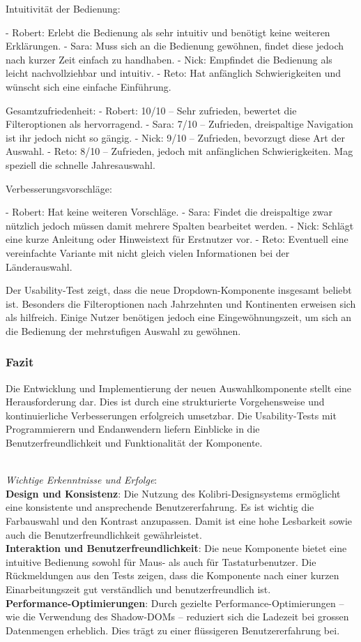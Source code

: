 Intuitivität der Bedienung:

- Robert: Erlebt die Bedienung als sehr intuitiv und benötigt keine weiteren Erklärungen.
- Sara: Muss sich an die Bedienung gewöhnen, findet diese jedoch nach kurzer Zeit einfach zu handhaben.
- Nick: Empfindet die Bedienung als leicht nachvollziehbar und intuitiv.
- Reto: Hat anfänglich Schwierigkeiten und wünscht sich eine einfache Einführung.

Gesamtzufriedenheit:
- Robert: 10/10 – Sehr zufrieden, bewertet die Filteroptionen als hervorragend.
- Sara: 7/10 – Zufrieden, dreispaltige Navigation ist ihr jedoch nicht so gängig.
- Nick: 9/10 – Zufrieden, bevorzugt diese Art der Auswahl.
- Reto: 8/10 – Zufrieden, jedoch mit anfänglichen Schwierigkeiten. Mag speziell die schnelle Jahresauswahl.

Verbesserungsvorschläge:

- Robert: Hat keine weiteren Vorschläge.
- Sara: Findet die dreispaltige zwar nützlich jedoch müssen damit mehrere Spalten bearbeitet werden.
- Nick: Schlägt eine kurze Anleitung oder Hinweistext für Erstnutzer vor.
- Reto: Eventuell eine vereinfachte Variante mit nicht gleich vielen Informationen bei der Länderauswahl.


Der Usability-Test zeigt, dass die neue Dropdown-Komponente insgesamt beliebt ist. Besonders die Filteroptionen nach Jahrzehnten und Kontinenten erweisen sich als hilfreich. Einige Nutzer benötigen jedoch eine Eingewöhnungszeit, um sich an die Bedienung der mehrstufigen Auswahl zu gewöhnen.


\subsubsection{Fazit}
\label{sec:userTestsSummery}

Die Entwicklung und Implementierung der neuen Auswahlkomponente stellt eine Herausforderung dar. 
Dies ist durch eine strukturierte Vorgehensweise und kontinuierliche Verbesserungen erfolgreich umsetzbar. 
Die Usability-Tests mit Programmierern und Endanwendern liefern Einblicke in die Benutzerfreundlichkeit und Funktionalität der Komponente. 

 \\
\noindent
\emph{Wichtige Erkenntnisse und Erfolge}: 
\\
\textbf{Design und Konsistenz}: 
Die Nutzung des Kolibri-Designsystems ermöglicht eine konsistente und ansprechende Benutzererfahrung. 
Es ist wichtig die Farbauswahl und den Kontrast anzupassen. 
Damit ist eine hohe Lesbarkeit sowie auch die Benutzerfreundlichkeit gewährleistet.
\\
\textbf{Interaktion und Benutzerfreundlichkeit}: 
Die neue Komponente bietet eine intuitive Bedienung sowohl für Maus- als auch für Tastaturbenutzer. 
Die Rückmeldungen aus den Tests zeigen, dass die Komponente nach einer kurzen Einarbeitungszeit gut verständlich und benutzerfreundlich ist. 
\\
\textbf{Performance-Optimierungen}: 
Durch gezielte Performance-Optimierungen – wie die Verwendung des Shadow-DOMs – reduziert sich die Ladezeit bei grossen Datenmengen erheblich. 
Dies trägt zu einer flüssigeren Benutzererfahrung bei. 

